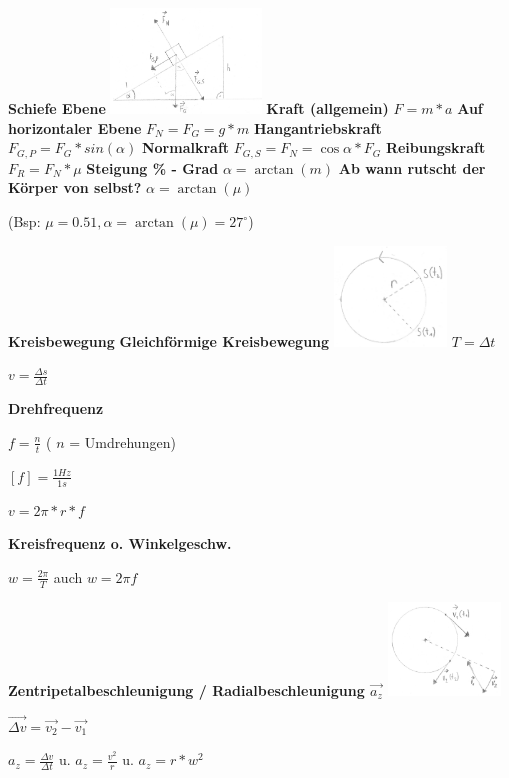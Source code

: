 \documentclass[a4paper,9pt]{article}
\begin{document}
\begin{multicols}{4}
	\textbf{Schiefe Ebene}
	\includegraphics[width=4cm]{gr1}
	\textbf{Kraft (allgemein)}
	\(F = m * a\)
	\textbf{Auf horizontaler Ebene}
	\(F_N = F_G = g * m\)
	\textbf{Hangantriebskraft}
	\(F_{G,P} = F_G * sin(\alpha)\)
	\textbf{Normalkraft}
	\(F_{G,S} = F_N = \cos\alpha*F_G\)
	\textbf{Reibungskraft}
	\(F_R = F_N * \mu\)
	\textbf{Steigung \% - Grad}
	\(\alpha = \arctan(m) \)
	\textbf{Ab wann rutscht der Körper von selbst?}
	\(\alpha = \arctan(\mu)\)
	
	 (Bsp: \(\mu = 0.51, \alpha = \arctan(\mu) = 27^\circ\))
	
	
	
	
	\textbf{Kreisbewegung}
	\textbf{Gleichförmige Kreisbewegung}
	\includegraphics[width=3cm]{gr2.png}
	$ T=\Delta t $
	
	$ v=\frac{\Delta s}{\Delta t} $
	
	\textbf{Drehfrequenz}
	
	$ f = \frac{n}{t} $ ( $n$ = Umdrehungen)
	
	$ [f] = \frac{1Hz}{1s} $
	
	$ v = 2\pi * r * f $
	
	\textbf{Kreisfrequenz o. Winkelgeschw.}
	
	$ w = \frac{2\pi}{T} $ auch $ w = 2\pi f $
	
	\textbf{Zentripetalbeschleunigung / Radialbeschleunigung $ \vec{a_z} $ }
	\includegraphics[width=3cm]{gr3}
	
	$ \vec{\Delta v} = \vec{v_2} - \vec{v_1} $
	
	$ a_z = \frac{\Delta v}{\Delta t} $ u. $ a_z = \frac{v^2}{r} $ u. $ a_z = r*w^2 $
	

\end{multicols}
\end{document}
